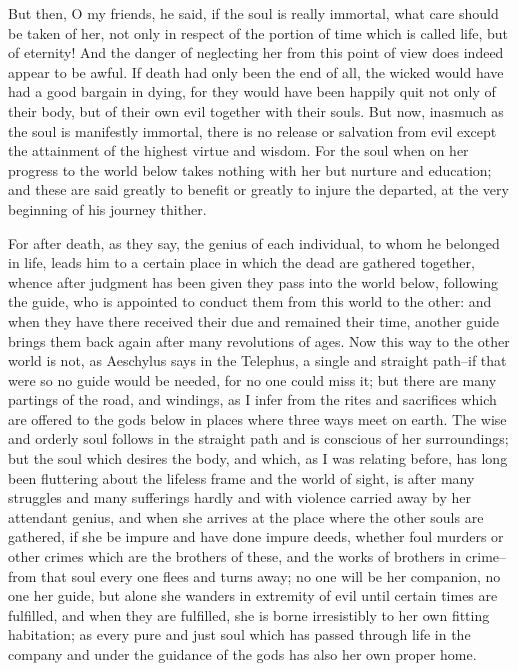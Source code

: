 But then, O my friends, he said, if the soul is really immortal, what
care should be taken of her, not only in respect of the portion of time
which is called life, but of eternity! And the danger of neglecting her
from this point of view does indeed appear to be awful. If death had
only been the end of all, the wicked would have had a good bargain in
dying, for they would have been happily quit not only of their body, but
of their own evil together with their souls. But now, inasmuch as the
soul is manifestly immortal, there is no release or salvation from evil
except the attainment of the highest virtue and wisdom. For the soul
when on her progress to the world below takes nothing with her but
nurture and education; and these are said greatly to benefit or greatly
to injure the departed, at the very beginning of his journey thither.

For after death, as they say, the genius of each individual, to whom
he belonged in life, leads him to a certain place in which the dead are
gathered together, whence after judgment has been given they pass into
the world below, following the guide, who is appointed to conduct them
from this world to the other: and when they have there received their
due and remained their time, another guide brings them back again after
many revolutions of ages. Now this way to the other world is not, as
Aeschylus says in the Telephus, a single and straight path--if that were
so no guide would be needed, for no one could miss it; but there are
many partings of the road, and windings, as I infer from the rites and
sacrifices which are offered to the gods below in places where three
ways meet on earth. The wise and orderly soul follows in the straight
path and is conscious of her surroundings; but the soul which desires
the body, and which, as I was relating before, has long been fluttering
about the lifeless frame and the world of sight, is after many struggles
and many sufferings hardly and with violence carried away by her
attendant genius, and when she arrives at the place where the other
souls are gathered, if she be impure and have done impure deeds, whether
foul murders or other crimes which are the brothers of these, and the
works of brothers in crime--from that soul every one flees and turns
away; no one will be her companion, no one her guide, but alone she
wanders in extremity of evil until certain times are fulfilled, and
when they are fulfilled, she is borne irresistibly to her own fitting
habitation; as every pure and just soul which has passed through life in
the company and under the guidance of the gods has also her own proper
home.

